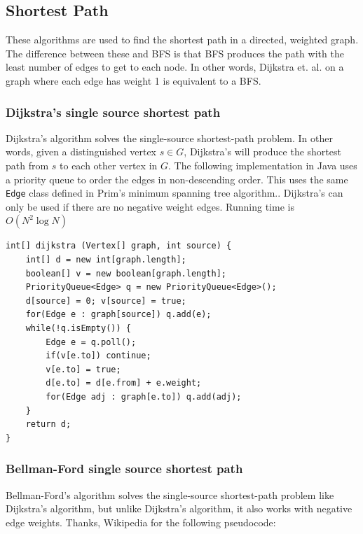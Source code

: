 \documentclass[a4paper,12pt]{article}
\begin{document}
\subsection{Shortest Path}

These algorithms are used to find the shortest path in a directed, weighted graph. The difference between these and BFS is that BFS produces the path with the least number of edges to get to each node. In other words, Dijkstra et. al. on a graph where each edge has weight 1 is equivalent to a BFS.

\subsubsection{Dijkstra's single source shortest path}

Dijkstra's algorithm solves the single-source shortest-path problem. In other words, given a distinguished vertex $s \in G$, Dijkstra's will produce the shortest path from $s$ to each other vertex in $G$. The following implementation in Java uses a priority queue to order the edges in non-descending order. This uses the same \lstinline/Edge/ class defined in Prim's minimum spanning tree algorithm.. Dijkstra's can only be used if there are no negative weight edges. Running time is $O(N^2\log N)$


\begin{lstlisting}
int[] dijkstra (Vertex[] graph, int source) {
	int[] d = new int[graph.length];
	boolean[] v = new boolean[graph.length];
	PriorityQueue<Edge> q = new PriorityQueue<Edge>();
	d[source] = 0; v[source] = true;
	for(Edge e : graph[source]) q.add(e);
	while(!q.isEmpty()) {
		Edge e = q.poll();
		if(v[e.to]) continue;
		v[e.to] = true;
		d[e.to] = d[e.from] + e.weight;
		for(Edge adj : graph[e.to]) q.add(adj);
	}
	return d;
}
\end{lstlisting}

\subsubsection{Bellman-Ford single source shortest path}

Bellman-Ford's algorithm solves the single-source shortest-path problem like Dijkstra's algorithm, but unlike Dijkstra's algorithm, it also works with negative edge weights. Thanks, Wikipedia for the following pseudocode:
\end{document}
